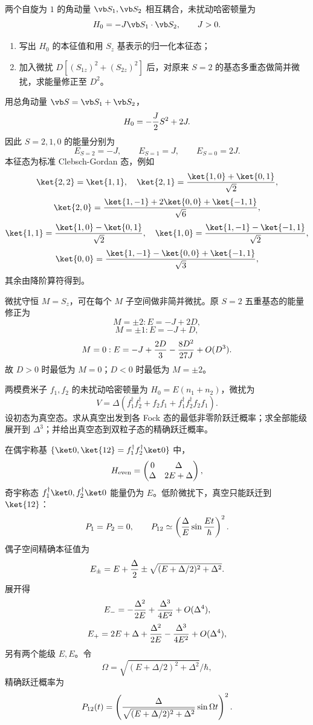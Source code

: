 
\begin{question}
两个自旋为 $1$ 的角动量 $\vb S_1,\vb S_2$ 相互耦合，未扰动哈密顿量为
\[
  H_0=-J\vb S_1\cdot\vb S_2,
  \qquad J>0.
\]
\begin{enumerate}
  \item 写出 $H_0$ 的本征值和用 $S_z$ 基表示的归一化本征态；
  \item 加入微扰 $D[(S_{1z})^2+(S_{2z})^2]$ 后，对原来 $S=2$ 的基态多重态做简并微扰，求能量修正至 $D^2$。
\end{enumerate}
\begin{solution}
用总角动量 $\vb S=\vb S_1+\vb S_2$，
\[
  H_0=-{J\over2}S^2+2J.
\]
因此 $S=2,1,0$ 的能量分别为
\[
  E_{S=2}=-J,
  \qquad E_{S=1}=J,
  \qquad E_{S=0}=2J.
\]
本征态为标准 Clebsch-Gordan 态，例如
\[
\ket{2,2}=\ket{1,1},
\quad \ket{2,1}={\ket{1,0}+\ket{0,1}\over\sqrt2},
\]
\[
\ket{2,0}={\ket{1,-1}+2\ket{0,0}+\ket{-1,1}\over\sqrt6},
\]
\[
\ket{1,1}={\ket{1,0}-\ket{0,1}\over\sqrt2},
\quad
\ket{1,0}={\ket{1,-1}-\ket{-1,1}\over\sqrt2},
\]
\[
\ket{0,0}={\ket{1,-1}-\ket{0,0}+\ket{-1,1}\over\sqrt3},
\]
其余由降阶算符得到。

微扰守恒 $M=S_z$，可在每个 $M$ 子空间做非简并微扰。原 $S=2$ 五重基态的能量修正为
\[
  M=\pm2: E=-J+2D,
\]
\[
  M=\pm1: E=-J+D,
\]
\[
  M=0: E=-J+{2D\over3}-{8D^2\over27J}+O(D^3).
\]
故 $D>0$ 时最低为 $M=0$；$D<0$ 时最低为 $M=\pm2$。
\end{solution}
\end{question}

\begin{question}
两模费米子 $f_1,f_2$ 的未扰动哈密顿量为 $H_0=E(n_1+n_2)$，微扰为
\[
  V=\Delta(f_1^\dagger f_2^\dagger+f_2f_1+f_1^\dagger f_2^\dagger f_2f_1).
\]
设初态为真空态。求从真空出发到各 Fock 态的最低非零阶跃迁概率；求全部能级展开到 $\Delta^3$；并给出真空态到双粒子态的精确跃迁概率。
\begin{solution}
在偶宇称基 $\{\ket0,\ket{12}=f_1^\dagger f_2^\dagger\ket0\}$ 中，
\[
  H_{\rm even}=\begin{pmatrix}0&\Delta\\ \Delta&2E+\Delta\end{pmatrix},
\]
奇宇称态 $f_1^\dagger\ket0,f_2^\dagger\ket0$ 能量仍为 $E$。低阶微扰下，真空只能跃迁到 $\ket{12}$：
\[
  P_1=P_2=0,
  \qquad P_{12}\simeq\left({\Delta\over E}\sin{Et\over\hbar}\right)^2.
\]
偶子空间精确本征值为
\[
  E_\pm=E+{\Delta\over2}\pm\sqrt{(E+\Delta/2)^2+\Delta^2}.
\]
展开得
\[
  E_-=-{\Delta^2\over2E}+{\Delta^3\over4E^2}+O(\Delta^4),
\]
\[
  E_+=2E+\Delta+{\Delta^2\over2E}-{\Delta^3\over4E^2}+O(\Delta^4),
\]
另有两个能级 $E,E$。令
\[
  \Omega=\sqrt{(E+\Delta/2)^2+\Delta^2}/\hbar,
\]
精确跃迁概率为
\[
  P_{12}(t)=\left({\Delta\over\sqrt{(E+\Delta/2)^2+\Delta^2}}\sin\Omega t\right)^2.
\]
\end{solution}
\end{question}

